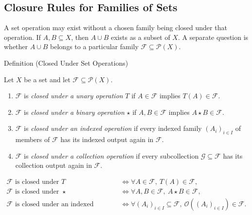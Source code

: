 
\subsection{Closure Rules for Families of Sets}

\begin{exposition}
A set operation may exist without a chosen family being closed under that
operation.  If \(A,B\subseteq X\), then \(A\cup B\) exists as a subset of
\(X\).  A separate question is whether \(A\cup B\) belongs to a particular
family \(\mathcal F\subseteq\mathcal P(X)\).
\end{exposition}

\begin{definitionbox}{Definition (Closed Under Set Operations)}
\begin{definition}\label{def:closed-under-set-operation-vocabulary}
Let \(X\) be a set and let \(\mathcal F\subseteq\mathcal P(X)\).
\begin{enumerate}[label=(\roman*)]
\item \(\mathcal F\) is \emph{closed under a unary operation} \(T\) if
      \(A\in\mathcal F\) implies \(T(A)\in\mathcal F\).
\item \(\mathcal F\) is \emph{closed under a binary operation} \(\star\) if
      \(A,B\in\mathcal F\) implies \(A\star B\in\mathcal F\).
\item \(\mathcal F\) is \emph{closed under an indexed operation} if every
      indexed family \((A_i)_{i\in I}\) of members of \(\mathcal F\) has its
      indexed output again in \(\mathcal F\).
\item \(\mathcal F\) is \emph{closed under a collection operation} if every
      subcollection \(\mathcal G\subseteq\mathcal F\) has its collection output
      again in \(\mathcal F\).
\end{enumerate}
\end{definition}
\end{definitionbox}

\begin{remark*}
\[
\begin{aligned}
\mathcal F\text{ is closed under }T
&\iff \forall A\in\mathcal F,\ T(A)\in\mathcal F,\\
\mathcal F\text{ is closed under }\star
&\iff \forall A,B\in\mathcal F,\ A\star B\in\mathcal F,\\
\mathcal F\text{ is closed under an indexed operation}
&\iff \forall (A_i)_{i\in I}\subseteq\mathcal F,\ \mathcal O((A_i)_{i\in I})\in\mathcal F.
\end{aligned}
\]
\end{remark*}

